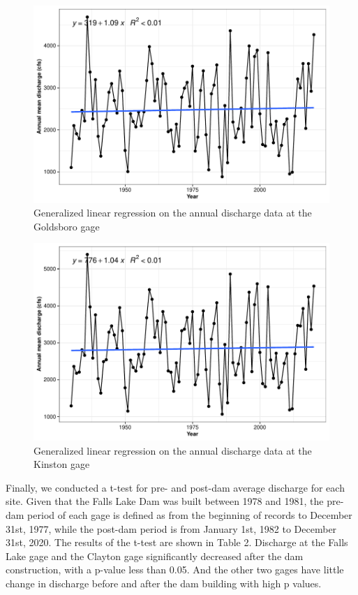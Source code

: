 \documentclass[
  12pt,
]{article}
\begin{document}
\begin{figure}

\includegraphics{Gardner_Zeng_ENV872_Project_files/figure-latex/GLM Goldsboro-1} \hfill{}

\caption{Generalized linear regression on the annual discharge data at the Goldsboro gage}\label{fig:GLM Goldsboro}
\end{figure}

\begin{figure}

\includegraphics{Gardner_Zeng_ENV872_Project_files/figure-latex/GLM Kinston-1} \hfill{}

\caption{Generalized linear regression on the annual discharge data at the Kinston gage}\label{fig:GLM Kinston}
\end{figure}

Finally, we conducted a t-test for pre- and post-dam average discharge
for each site. Given that the Falls Lake Dam was built between 1978 and
1981, the pre-dam period of each gage is defined as from the beginning
of records to December 31st, 1977, while the post-dam period is from
January 1st, 1982 to December 31st, 2020. The results of the t-test are
shown in Table 2. Discharge at the Falls Lake gage and the Clayton gage
significantly decreased after the dam construction, with a p-value less
than 0.05. And the other two gages have little change in discharge
before and after the dam building with high p values.
\end{document}

